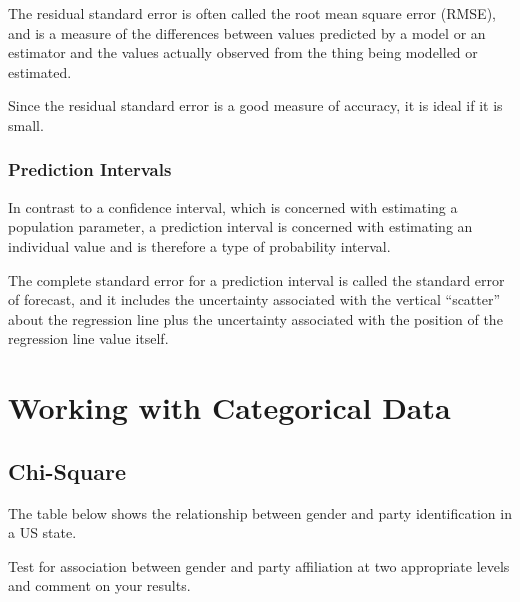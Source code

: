 \documentclass[a4paper,12pt]{article}
\begin{document}
\begin{itemize}
\begin{itemize}
		The residual standard error is often called the root mean square error (RMSE), and is a measure of the differences between values predicted by a model or an estimator and the values actually observed from the thing being modelled or estimated.
		
		Since the residual standard error is a good measure of accuracy, it is ideal if it is small.
		
		\subsubsection{Prediction Intervals}
		In contrast to a confidence interval, which is concerned with estimating a population parameter, a prediction interval is concerned with estimating an individual value and is therefore a type of probability interval. 
		
		The complete standard error for a prediction interval is called the standard error of forecast, and it includes the uncertainty associated with the vertical “scatter” about the regression line plus the uncertainty associated with the position of the regression line value itself.
		
		
		
		
		
		
		
		
		
		\newpage
		\section{Working with Categorical Data}
		\subsection{Chi-Square}
		
		The table below shows the relationship between gender and party identification in a US state.
		
		
		
		Test for association between gender and party affiliation at two appropriate levels
		and comment on your results.
		

\end{itemize}
\end{itemize}
\end{document}
